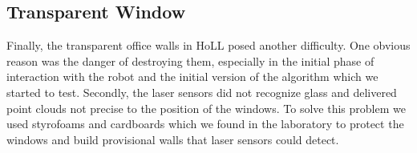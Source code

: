 \subsection{Transparent Window}
Finally, the transparent office walls in HoLL posed another difficulty. One obvious reason was the danger of destroying them, especially in the initial phase of interaction with the robot and the initial version of the algorithm which we started to test. Secondly, the laser sensors did not recognize glass and delivered point clouds not precise to the position of the windows. To solve this problem we used styrofoams and cardboards which we found in the laboratory to protect the windows and build provisional walls that laser sensors could detect.
